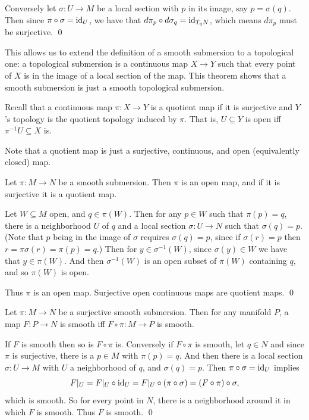     Conversely let $\sigma\colon U\to M$ be a local section with $p$ in its image, say $p=\sigma(q)$.
    Then since $\pi\circ\sigma={\rm id}_U$, we have that $d\pi_p\circ d\sigma_q={\rm id}_{T_qN}$, which means $d\pi_p$ must be surjective.
    \qed

\eproof

This allows us to extend the definition of a smooth submersion to a topological one: a {\emphcolor topological submersion} is a continuous map
$X\to Y$ such that every point of $X$ is in the image of a local section of the map.
This theorem shows that a smooth submersion is just a smooth topological submersion.

\bdefn

    Recall that a continuous map $\pi\colon X\to Y$ is a {\emphcolor quotient map} if it is surjective and $Y$'s topology is the quotient topology
    induced by $\pi$.
    That is, $U\subseteq Y$ is open iff $\pi^{-1}U\subseteq X$ is.

\edefn

Note that a quotient map is just a surjective, continuous, and open (equivalently closed) map.

\bprop

    Let $\pi\colon M\to N$ be a smooth submersion.
    Then $\pi$ is an open map, and if it is surjective it is a quotient map.

\eprop

\bproof

    Let $W\subseteq M$ open, and $q\in\pi(W)$.
    Then for any $p\in W$ such that $\pi(p)=q$, there is a neighborhood $U$ of $q$ and a local section $\sigma\colon U\to N$ such that $\sigma(q)=p$.
    (Note that $p$ being in the image of $\sigma$ requires $\sigma(q)=p$, since if $\sigma(r)=p$ then $r=\pi\sigma(r)=\pi(p)=q$.)
    Then for $y\in\sigma^{-1}(W)$, since $\sigma(y)\in W$ we have that $y\in\pi(W)$.
    And then $\sigma^{-1}(W)$ is an open subset of $\pi(W)$ containing $q$, and so $\pi(W)$ is open.

    Thus $\pi$ is an open map.
    Surjective open continuous maps are quotient maps.
    \qed

\eproof

\bthrm

    Let $\pi\colon M\to N$ be a surjective smooth submersion.
    Then for any manifold $P$, a map $F\colon P\to N$ is smooth iff $F\circ\pi\colon M\to P$ is smooth.

\ethrm

\bproof

    If $F$ is smooth then so is $F\circ\pi$ is.
    Conversely if $F\circ\pi$ is smooth, let $q\in N$ and since $\pi$ is surjective, there is a $p\in M$ with $\pi(p)=q$.
    And then there is a local section $\sigma\colon U\to M$ with $U$ a neighborhood of $q$, and $\sigma(q)=p$.
    Then $\pi\circ\sigma={\rm id}_U$ implies
    $$ F|_U = F|_U\circ{\rm id}_U = F|_U\circ(\pi\circ\sigma) = (F\circ\pi)\circ\sigma, $$
    which is smooth.
    So for every point in $N$, there is a neighborhood around it in which $F$ is smooth.
    Thus $F$ is smooth.
    \qed

